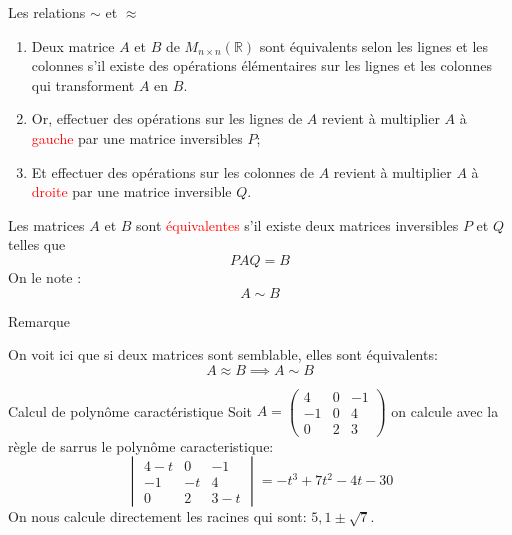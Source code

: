 \begin{parag}{Les relations $\sim$ et $\approx$}

    \begin{enumerate}
        \item Deux matrice $A$ et $B$ de $M_{n \times n}(\mathbb{R})$ sont équivalents selon les lignes et les colonnes s'il existe des opérations élémentaires sur les lignes et les colonnes qui transforment $A$ en $B$.
        \item Or, effectuer des opérations sur les lignes de $A$ revient à multiplier $A$ à \textcolor{red}{gauche} par une matrice inversibles $P$;
        \item Et effectuer des opérations sur les colonnes de $A$ revient à multiplier $A$ à \textcolor{red}{droite} par une matrice inversible $Q$.
    \end{enumerate}
    \begin{definition}
        Les matrices $A$ et $B$ sont \textcolor{red}{équivalentes} s'il existe deux matrices inversibles $P$ et $Q$ telles que 
        \[PAQ = B\]
        On le note :
        \[A \sim B\]
    \end{definition}
    \begin{subparag}{Remarque}
        \begin{framedremark}
            On voit ici que si deux matrices sont semblable, elles sont équivalents:
            \[A \approx B \implies A \sim B\]
        \end{framedremark}
    \end{subparag}
\end{parag}
\begin{parag}{Calcul de polynôme caractéristique}
    Soit $A = \begin{pmatrix}
        4 & 0 & -1\\
        -1 & 0 & 4 \\
        0 & 2 & 3
    \end{pmatrix}$ on calcule avec la règle de sarrus le polynôme caracteristique:
\[\begin{vmatrix}
    4-t & 0 & -1\\
    -1 &-t & 4\\
    0 & 2 & 3-t
\end{vmatrix} = -t^3 + 7t^2 -4t -30\]
On nous calcule directement les racines qui sont: $5, 1 \pm \sqrt{7}$.
\end{parag}


